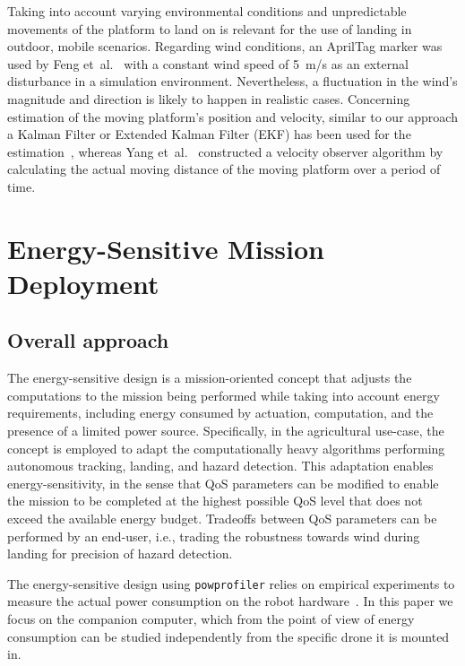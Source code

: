 \documentclass[conference]{IEEEtran}
\newcommand{\stt}[1]{{\small\tt #1}} %
\newcommand{\powprof}{\stt{powprofiler}}
\begin{document}
Taking into account varying environmental conditions and unpredictable
movements of the platform to land on is relevant for the use of
landing in outdoor, mobile scenarios.  Regarding wind conditions, an
AprilTag marker was used by Feng et~al.~\cite{feng2018autonomous} with
a constant wind speed of 5~m/s as an external disturbance in a
simulation environment. Nevertheless, a fluctuation in the wind's
magnitude and direction is likely to happen in realistic cases.
Concerning estimation of the moving platform's position and velocity,
similar to our approach a Kalman Filter or Extended Kalman Filter (EKF) has been used for the
estimation~\cite{araar2017vision,feng2018autonomous,
  falanga2017vision}, whereas Yang et~al.~\cite{yang2018hybrid}
constructed a velocity observer algorithm by calculating the actual
moving distance of the moving platform over a period of time.

\section{Energy-Sensitive Mission Deployment} 
\label{sec:approach}

\subsection{Overall approach}

The energy-sensitive design is a mission-oriented concept that adjusts
the computations to the mission being performed while taking into
account energy requirements, including energy consumed by actuation,
computation, and the presence of a limited power source. Specifically,
in the agricultural use-case, the concept is employed to adapt the
computationally heavy algorithms performing autonomous tracking,
landing, and hazard detection. This adaptation enables
energy-sensitivity, in the sense that QoS parameters can be modified
to enable the mission to be completed at the highest possible QoS
level that does not exceed the available energy budget. Tradeoffs
between QoS parameters can be performed by an end-user, i.e., trading
the robustness towards wind during landing for precision of hazard
detection.

The energy-sensitive design using \powprof{} relies on empirical
experiments to measure the actual power consumption on the robot
hardware~\cite{seewald2019coarse}. In this paper we focus on the
companion computer, which from the point of view of energy consumption
can be studied independently from the specific drone it is mounted in.
\end{document}
